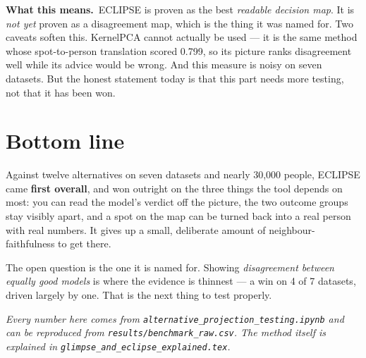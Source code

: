 \documentclass[11pt]{article}
\newcommand{\hl}[1]{\textcolor{accent}{\textbf{#1}}}
\newcommand{\means}{\textbf{\textcolor{accent}{What this means.}}\ }
\begin{document}
\means ECLIPSE is proven as the best \emph{readable decision map}. It is \emph{not yet}
proven as a disagreement map, which is the thing it was named for. Two caveats soften
this. KernelPCA cannot actually be used --- it is the same method whose spot-to-person
translation scored 0.799, so its picture ranks disagreement well while its advice would
be wrong. And this measure is noisy on seven datasets. But the honest statement today is
that this part needs more testing, not that it has been won.

\section*{Bottom line}

\begin{keybox}
Against twelve alternatives on seven datasets and nearly 30,000 people, ECLIPSE came
\hl{first overall}, and won outright on the three things the tool depends on most: you
can read the model's verdict off the picture, the two outcome groups stay visibly apart,
and a spot on the map can be turned back into a real person with real numbers. It gives
up a small, deliberate amount of neighbour-faithfulness to get there.

The open question is the one it is named for. Showing \emph{disagreement between equally
good models} is where the evidence is thinnest --- a win on 4 of 7 datasets, driven
largely by one. That is the next thing to test properly.
\end{keybox}

\vfill
\noindent\footnotesize
\textit{Every number here comes from \texttt{alternative\_projection\_testing.ipynb} and
can be reproduced from \texttt{results/benchmark\_raw.csv}. The method itself is
explained in \texttt{glimpse\_and\_eclipse\_explained.tex}.}
\end{document}
